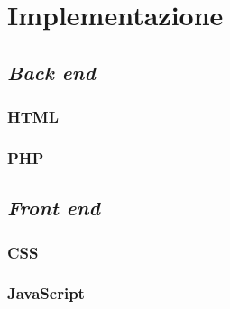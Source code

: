 \section{Implementazione}
\label{implementazione}

\subsection{\textit{Back end}}
\label{implementazione-front-end}

\subsubsection{HTML}
\label{implementazione-back-end-HTML}

\subsubsection{PHP}
\label{implementazione-back-end-PHP}

\subsection{\textit{Front end}}
\label{implementazione-front-end}

\subsubsection{CSS}
\label{implementazione-front-end-CSS}

\subsubsection{JavaScript}
\label{implementazione-front-end-JavaScript}